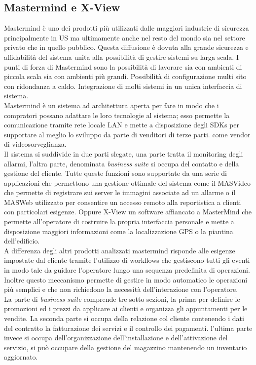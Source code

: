 \subsection{Mastermind e X-View}
Mastermind è uno dei prodotti più utilizzati dalle maggiori industrie di sicurezza principalmente in US ma ultimamente anche nel resto del mondo sia nel settore privato che in quello pubblico. Questa diffusione è dovuta alla grande sicurezza e affidabilità del sistema unita alla possibilità di gestire sistemi su larga scala. I punti di forza di Mastermind sono la possibilità di lavorare sia con ambienti di piccola scala sia con ambienti più grandi. Possibilità di configurazione multi sito con ridondanza a caldo. Integrazione di molti sistemi in un unica interfaccia di sistema.\\
Mastermind è un sistema ad architettura aperta per fare in modo che i compratori possano adattare le loro tecnologie al sistema; esso permette la comunicazione tramite rete locale LAN e mette a disposizione degli SDKs per supportare al meglio lo sviluppo da parte di venditori di terze parti. come vendor di videosorveglianza.\\
Il sistema si suddivide in due parti slegate, una parte tratta il monitoring degli allarmi, l'altra parte, denominata \emph{business suite} si occupa del contatto e della gestione del cliente. Tutte queste funzioni sono supportate da una serie di applicazioni che permettono una gestione ottimale del sistema come il MASVideo che permette di registrare sui server le immagini associate ad un allarme o il MASWeb utilizzato per consentire un accesso remoto alla reportistica a clienti con particolari esigenze. Oppure X-View un software affiancato a MasterMind che permette all'operatore di costruire la propria interfaccia personale e mette a disposizione maggiori informazioni come la localizzazione GPS o la piantina dell'edificio.\\
A differenza degli altri prodotti analizzati mastermind risponde alle esigenze impostate dal cliente tramite l'utilizzo di workflows che gestiscono tutti gli eventi in modo tale da guidare l'operatore lungo una sequenza predefinita di operazioni. Inoltre questo meccanismo permette di gestire in modo automatico le operazioni più semplici e che non richiedono la necessità dell'interazione con l'operatore.\\
La parte di \emph{business suite} comprende tre sotto sezioni, la prima per definire le promozioni ed i prezzi da applicare ai clienti e organizza gli appuntamenti per le vendite. La seconda parte si occupa della relazione col cliente contenendo i dati del contratto la fatturazione dei servizi e il controllo dei pagamenti. l'ultima parte invece si occupa dell'organizzazione dell'installazione e dell'attivazione del servizio, si può occupare della gestione del magazzino mantenendo un inventario aggiornato.
